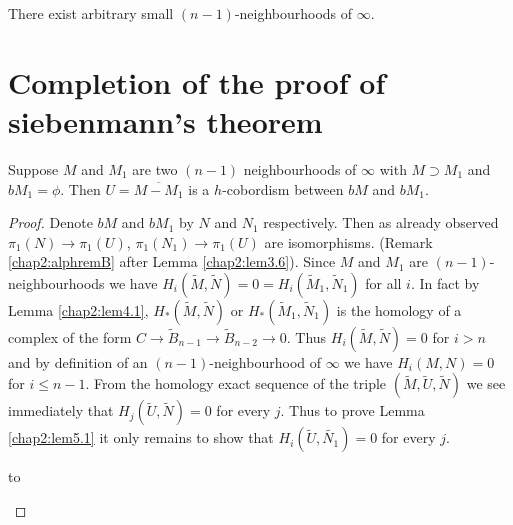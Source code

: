 \setcounter{prop}{6}
\begin{prop}\label{chap2:prop4.7}%
There exist arbitrary small $(n-1)$-neighbourhoods of $\infty$.
 \end{prop} 
 
 \section{Completion of the proof of siebenmann's theorem}\label{chap2:sec5}%
 
 \begin{lemma}\label{chap2:lem5.1}%
Suppose $M$ and $M_1$ are two $(n-1)$ neighbourhoods of $\infty$ with 
$M \supset M_1$ and $bM_1= \phi$. Then $U= \overline{M-M_1}$ is a
$h$-cobordism between $bM$ and $bM_1$. 
 \end{lemma} 
 
 \begin{proof}
Denote $bM$ and $bM_1$ by $N$ and $N_1$ respectively. Then as already
observed $\pi_1 (N) \to \pi_1 (U)$, $\pi_1 (N_1) \to \pi_1 (U)$ are
isomorphisms. (Remark \ref{chap2:alphremB} after Lemma
\ref{chap2:lem3.6}). Since $M$ and $M_1$ are 
$(n-1)$-neighbourhoods we have $H_i (\tilde{M}, \tilde{N}) = 0 = H_i
(\tilde{M}_1, \tilde{N}_1)$ for all $i$. In fact by Lemma \ref{chap2:lem4.1}, $H_*
(\tilde{M}, \tilde{N})$  or $H_* (\tilde{M}_1, \tilde{N}_1) $
is the homology of a complex of the form $C \to \tilde{B}_{n-1} \to
\tilde{B}_{n-2} \to 0$. Thus $H_i (\tilde{M}, \tilde{N}) = 0$ for
$i>n$ and by definition of an $(n-1)$-neighbourhood of $\infty$ we have
$H_i (M, N) = 0$ for $i \leq n-1$. From the homology exact sequence of
the triple $(\tilde{M}, \tilde{U}, \tilde{N})$ 
we see immediately that $H_j (\tilde{U}, \tilde{N}) = 0$ for every
$j$. Thus to prove Lemma \ref{chap2:lem5.1} it only remains to show that $H_i
(\tilde{U}, \tilde{N_1})=0$ for every $j$. 

\begin{landscape}
\vbox to
\end{landscape}
 \end{proof}
 
